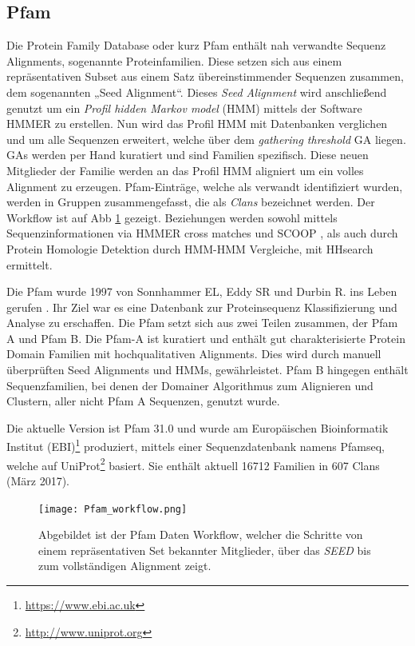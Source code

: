 \subsection{Pfam}
\label{sec:pfam}
Die Protein Family Database \cite{Finn.2014} oder kurz Pfam enthält nah verwandte Sequenz Alignments, sogenannte Proteinfamilien. Diese setzen sich aus einem repräsentativen Subset aus einem Satz übereinstimmender Sequenzen zusammen, dem sogenannten „Seed Alignment“. Dieses \emph{Seed Alignment} wird anschließend genutzt um ein \emph{Profil hidden Markov model} (HMM) \cite{Soding.2005} mittels der Software HMMER \cite{Mistry.2013} zu erstellen. Nun wird das Profil HMM mit Datenbanken verglichen und um alle Sequenzen erweitert, welche über dem \emph{gathering threshold} GA liegen. GAs werden per Hand kuratiert und sind Familien spezifisch. Diese neuen Mitglieder der Familie werden an das Profil HMM aligniert um ein volles Alignment zu erzeugen. Pfam-Einträge, welche als verwandt identifiziert wurden, werden in Gruppen zusammengefasst, die als \emph{Clans} bezeichnet werden. Der Workflow ist auf \ac{Abb} \ref{fig:Pfam_workflow} gezeigt. Beziehungen werden sowohl mittels Sequenzinformationen via HMMER cross matches und SCOOP \cite{Bateman.2007}, als auch durch Protein Homologie Detektion durch HMM-HMM Vergleiche, mit HHsearch \cite{Fidler.2016} ermittelt.

Die Pfam wurde 1997 von Sonnhammer EL, Eddy SR und Durbin R. ins Leben gerufen \cite{Sonnhammer.1997}. Ihr Ziel war es eine Datenbank zur Proteinsequenz Klassifizierung und Analyse zu erschaffen. Die Pfam setzt sich aus zwei Teilen zusammen, der Pfam A und Pfam B. Die Pfam-A ist kuratiert und enthält gut charakterisierte Protein Domain Familien mit hochqualitativen Alignments. Dies wird durch manuell überprüften Seed Alignments und HMMs, gewährleistet. Pfam B hingegen enthält Sequenzfamilien, bei denen der Domainer Algorithmus zum Alignieren und Clustern, aller nicht Pfam A Sequenzen, genutzt wurde. 

Die aktuelle Version ist Pfam 31.0 und wurde am Europäischen Bioinformatik Institut (EBI)\footnote{\url{https://www.ebi.ac.uk}} produziert, mittels einer Sequenzdatenbank namens Pfamseq, welche auf UniProt\footnote{\url{http://www.uniprot.org}} basiert. Sie enthält aktuell 16712 Familien in 607 Clans (März 2017).
\begin{figure}
\texttt{[image: Pfam\_workflow.png]}
\caption{Abgebildet ist der \ac{Pfam} Daten Workflow, welcher die Schritte von einem repräsentativen Set bekannter Mitglieder, über das \emph{SEED} bis zum vollständigen Alignment zeigt.}
\label{fig:Pfam_workflow}
\end{figure}


